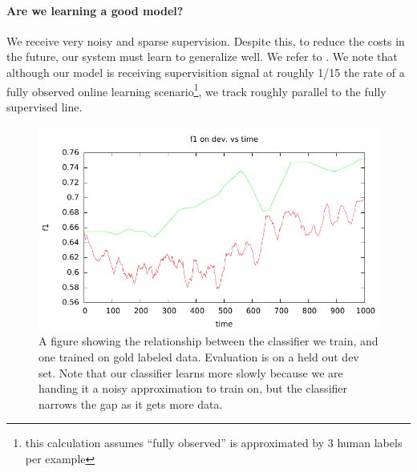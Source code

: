 \paragraph{Are we learning a good model?}
We receive very noisy and sparse supervision.
Despite this, to reduce the costs in the future, our system must learn to generalize well.
We refer to .
We note that although our model is receiving supervisition signal at roughly 1/15 the rate of a fully observed online learning scenario\footnote{this calculation assumes ``fully observed'' is approximated by 3 human labels per example}, we track roughly parallel to the fully supervised line.

\begin{figure}[t]
  \begin{centering}
  \includegraphics[width=1.0\textwidth]{figures/ner_2_class/machine_f1_plot/machine_f1_vs_time.pdf}
  \end{centering}
  \caption{A figure showing the relationship between the classifier we train, and one trained on gold labeled data. Evaluation is on a held out dev set. Note that our classifier learns more slowly because we are handing it a noisy approximation to train on, but the classifier narrows the gap as it gets more data.}
\label{fig:ner-dev-f1}
\end{figure}

